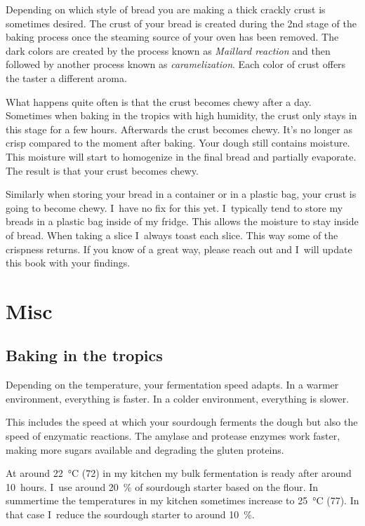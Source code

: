 Depending on which style of bread you are making a
thick crackly crust is sometimes desired. The crust
of your bread is created during the 2nd stage of the
baking process once the steaming source of your
oven has been removed. The dark colors are created by
the process known as \emph{Maillard reaction} and then followed
by another process known as \emph{caramelization}. Each
color of crust offers the taster a different aroma.

What happens quite often is that the crust becomes chewy after a day.
Sometimes when baking in the tropics with high humidity, the
crust only stays in this stage for a few hours. Afterwards
the crust becomes chewy. It's no longer as crisp compared
to the moment after baking. Your dough still contains moisture.
This moisture will start to homogenize in the final bread and
partially evaporate. The result is that your crust becomes chewy.

Similarly when storing your bread in a container or in a plastic
bag, your crust is going to become chewy. I~have no fix for this yet.
I~typically tend to store my breads in a plastic bag inside of my fridge.
This allows the moisture to stay inside of bread. When taking a slice
I~always toast each slice. This way some of the crispness returns.
If you know of a great way, please reach out and I~will update
this book with your findings.



\section{Misc}
\subsection{Baking in the tropics}

Depending on the temperature, your fermentation speed adapts.
In a warmer environment, everything is faster. In a colder
environment, everything is slower.

This includes the speed at which your sourdough ferments
the dough but also the speed of enzymatic reactions. The
amylase and protease enzymes work faster, making more
sugars available and degrading the gluten proteins.

At around \qty{22}{\degreeCelsius} (\qty{72}{\degF}) in my kitchen my bulk fermentation is ready
after around 10~hours. I~use around \qty{20}{\percent} of sourdough
starter based on the flour. In summertime the temperatures
in my kitchen sometimes increase to
\qty{25}{\degreeCelsius} (\qty{77}{\degF}). In that case
I~reduce the sourdough starter to around \qty{10}{\percent}.

